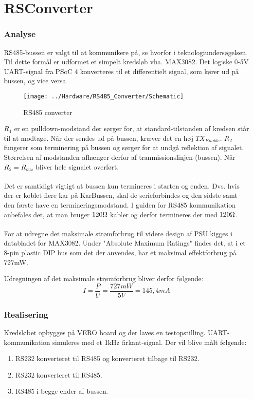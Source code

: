 \section{RSConverter}
\subsubsection{Analyse}
RS485-bussen er valgt til at kommunikere på, se hvorfor i teknologiundersøgelsen. Til dette formål er udformet et simpelt kredsløb vha. MAX3082. Det logiske 0-5V UART-signal fra PSoC 4 konverteres til et differentielt signal, som kører ud på bussen, og vice versa.

\begin{figure}[H]
	\centering
	\texttt{[image: ../Hardware/RS485\_Converter/Schematic]}
	\caption{RS485 converter}
	\label{photo:RS485converter}
\end{figure}

$R_1$ er en pulldown-modstand der sørger for, at standard-tilstanden af kredsen står til at modtage. Når der sendes ud på bussen, kræver det en høj $TX_{Enable}$. $R_2$ fungerer som terminering på bussen og sørger for at undgå reflektion af signalet. Størrelsen af modstanden afhænger derfor af tranmissionslinjen (bussen). Når $R_2 = R_{bus}$ bliver hele signalet overført. 
\\\\
Det er samtidigt vigtigt at bussen kun termineres i starten og enden. Dvs. hvis der er koblet flere kar på KarBussen, skal de serieforbindes og den sidste samt den første have en termineringsmodstand. I guiden for RS485 kommunikation anbefales det, at man bruger $120\ohm$ kabler og derfor termineres der med $120\ohm$. 
\\\\
For at udregne det maksimale strømforbrug til videre design af PSU kigges i databladet for MAX3082. Under "Absolute Maximum Ratings" findes det, at i et 8-pin plastic DIP hus som det der anvendes, har et maksimal effektforbrug på 727mW.

Udregningen af det maksimale strømforbrug bliver derfor følgende:
\begin{equation}
	I = \frac{P}{U} = \frac{727mW}{5V} = 145,4mA
\end{equation}


\subsubsection{Realisering}
Kredsløbet opbygges på VERO board og der laves en testopstilling. UART-kommunikation simuleres med et 1kHz firkant-signal. Der vil blive målt følgende:
\begin{enumerate}
\item RS232 konverteret til RS485 og konverteret tilbage til RS232.
\item RS232 konverteret til RS485.
\item RS485 i begge ender af bussen.
\end{enumerate}

